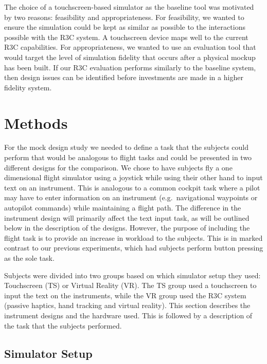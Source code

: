 The choice of a touchscreen-based simulator as the baseline tool was motivated by two reasons: feasibility and appropriateness.
For feasibility, we wanted to ensure the simulation could be kept as similar as possible to the interactions possible with the R3C system.
A touchscreen device maps well to the current R3C capabilities.
For appropriateness, we wanted to use an evaluation tool that would target the level of simulation fidelity that occurs after a physical mockup has been built.
If our R3C evaluation performs similarly to the baseline system, then design issues can be identified before investments are made in a higher fidelity system.

\section{Methods}

For the mock design study we needed to define a task that the subjects could perform that would be analogous to flight tasks and could be presented in two different designs for the comparison.
We chose to have subjects fly a one dimensional flight simulator using a joystick while using their other hand to input text on an instrument.
This is analogous to a common cockpit task where a pilot may have to enter information on an instrument (e.g.\ navigational waypoints or autopilot commands) while maintaining a flight path.
The difference in the instrument design will primarily affect the text input task, as will be outlined below in the description of the designs.
However, the purpose of including the flight task is to provide an increase in workload to the subjects.
This is in marked contrast to our previous experiments, which had subjects perform button pressing as the sole task.

Subjects were divided into two groups based on which simulator setup they used: Touchscreen (TS) or Virtual Reality (VR).
The TS group used a touchscreen to input the text on the instruments, while the VR group used the R3C system (passive haptics, hand tracking and virtual reality).
This section describes the instrument designs and the hardware used.
This is followed by a description of the task that the subjects performed.

\subsection{Simulator Setup}

